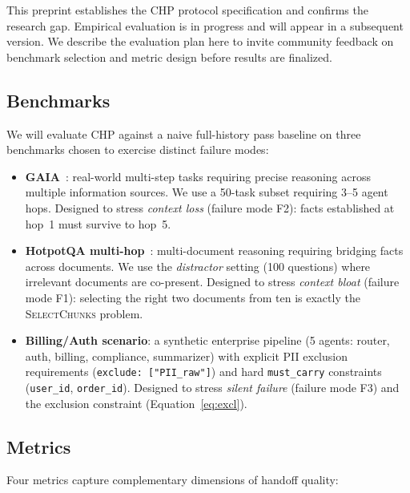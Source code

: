 \documentclass[11pt]{article}
\begin{document}
This preprint establishes the CHP protocol specification and confirms the
research gap. Empirical evaluation is in progress and will appear in a
subsequent version. We describe the evaluation plan here to invite
community feedback on benchmark selection and metric design before results
are finalized.

\subsection{Benchmarks}

We will evaluate CHP against a naive full-history pass baseline on three
benchmarks chosen to exercise distinct failure modes:

\begin{itemize}
  \item \textbf{GAIA}~\cite{mialon2023gaia}: real-world multi-step tasks
    requiring precise reasoning across multiple information sources. We use
    a 50-task subset requiring 3--5 agent hops. Designed to stress
    \emph{context loss} (failure mode F2): facts established at hop~1 must
    survive to hop~5.

  \item \textbf{HotpotQA multi-hop}~\cite{yang2018hotpotqa}: multi-document
    reasoning requiring bridging facts across documents. We use the
    \textit{distractor} setting (100 questions) where irrelevant documents
    are co-present. Designed to stress \emph{context bloat} (failure mode
    F1): selecting the right two documents from ten is exactly the
    \textsc{SelectChunks} problem.

  \item \textbf{Billing/Auth scenario}: a synthetic enterprise pipeline
    (5 agents: router, auth, billing, compliance, summarizer) with explicit
    PII exclusion requirements (\texttt{exclude: ["PII\_raw"]}) and
    hard \texttt{must\_carry} constraints (\texttt{user\_id},
    \texttt{order\_id}). Designed to stress \emph{silent failure}
    (failure mode F3) and the exclusion constraint (Equation~\ref{eq:excl}).
\end{itemize}

\subsection{Metrics}

Four metrics capture complementary dimensions of handoff quality:
\end{document}
